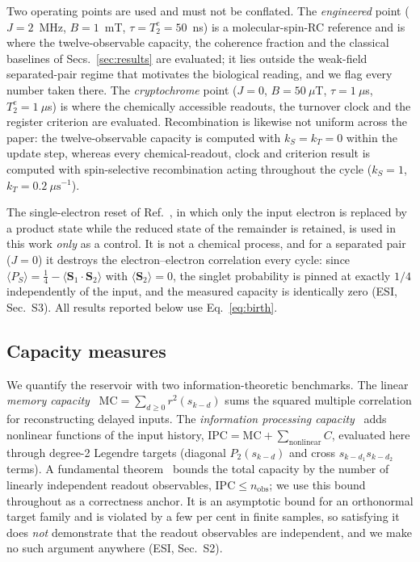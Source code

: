 \documentclass[aps,prx,reprint,superscriptaddress,nofootinbib,floatfix]{revtex4-2}
\begin{document}
Two operating points are used and must not be conflated. The \emph{engineered}
point ($J=2$~MHz, $B=1$~mT, $\tau=T_2^e=50$~ns) is a molecular-spin-RC reference
and is where the twelve-observable capacity, the coherence fraction and the
classical baselines of Secs.~\ref{sec:results} are evaluated; it lies outside the
weak-field separated-pair regime that motivates the biological reading, and we
flag every number taken there. The \emph{cryptochrome} point ($J=0$,
$B=50~\mu$T, $\tau=1~\mu$s, $T_2^e=1~\mu$s) is where the chemically accessible
readouts, the turnover clock and the register criterion are evaluated.
Recombination is likewise not uniform across the paper: the twelve-observable
capacity is computed with $k_S=k_T=0$ within the update step, whereas every
chemical-readout, clock and criterion result is computed with spin-selective
recombination acting throughout the cycle ($k_S=1$, $k_T=0.2~\mu\mathrm{s}^{-1}$).

The single-electron reset of Ref.~\cite{Fujii2017}, in which only the input
electron is replaced by a product state while the reduced state of the remainder
is retained, is used in this work \emph{only} as a control. It is not a chemical
process, and for a separated pair ($J=0$) it destroys the electron--electron
correlation every cycle: since
$\langle P_S\rangle=\tfrac14-\langle\bm S_1\!\cdot\!\bm S_2\rangle$ with
$\langle\bm S_2\rangle=0$, the singlet probability is pinned at exactly $1/4$
independently of the input, and the measured capacity is identically zero
(ESI, Sec.~S3). All results reported below use
Eq.~\eqref{eq:birth}.

\subsection{Capacity measures}
We quantify the reservoir with two information-theoretic benchmarks. The linear
\emph{memory capacity}~\cite{Jaeger2002}
$\mathrm{MC}=\sum_{d\ge0} r^2(s_{k-d})$ sums the squared multiple correlation for
reconstructing delayed inputs. The \emph{information processing
capacity}~\cite{Dambre2012} adds nonlinear functions of the input history,
$\mathrm{IPC}=\mathrm{MC}+\sum_{\text{nonlinear}}C$, evaluated here through
degree-2 Legendre targets (diagonal $P_2(s_{k-d})$ and cross
$s_{k-d_1}s_{k-d_2}$ terms). A fundamental theorem~\cite{Dambre2012} bounds the
total capacity by the number of linearly independent readout observables,
$\mathrm{IPC}\le n_\mathrm{obs}$; we use this bound throughout as a correctness
anchor. It is an asymptotic bound for an orthonormal target family and is violated
by a few per cent in finite samples, so satisfying it does \emph{not} demonstrate
that the readout observables are independent, and we make no such argument
anywhere (ESI, Sec.~S2).
\end{document}
